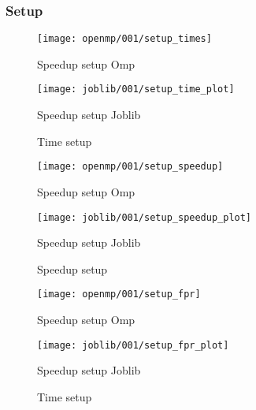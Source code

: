 \subsubsection{Setup}\label{subsubsec:setup}
\begin{figure}[H]
    \centering
    \texttt{[image: openmp/001/setup\_times]}
        \caption{Speedup setup Omp}\label{fig:setup_time_omp}
    \endminipage\hfill
    \texttt{[image: joblib/001/setup\_time\_plot]}
        \caption{Speedup setup Joblib}\label{fig:setup_time_joblib}
    \endminipage\hfill
    \caption{Time setup}
\end{figure}
\begin{figure}[H]
    \centering
    \texttt{[image: openmp/001/setup\_speedup]}
        \caption{Speedup setup Omp}\label{fig:setup_speedup_omp}
    \endminipage\hfill
    \texttt{[image: joblib/001/setup\_speedup\_plot]}
        \caption{Speedup setup Joblib}\label{fig:setup_speedup_joblib}
    \endminipage\hfill
    \caption{Speedup setup}
\end{figure}
\begin{figure}[H]
    \centering
    \texttt{[image: openmp/001/setup\_fpr]}
        \caption{Speedup setup Omp}\label{fig:setup_fpr_omp}
    \endminipage\hfill
    \texttt{[image: joblib/001/setup\_fpr\_plot]}
        \caption{Speedup setup Joblib}\label{fig:setup_fpr_joblib}
    \endminipage\hfill
    \caption{Time setup}
\end{figure}

